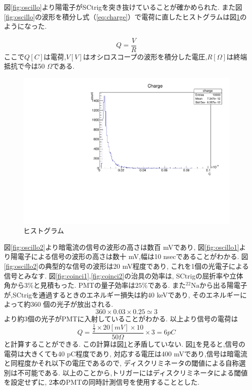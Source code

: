 図\ref{fig:oscillo}より陽電子がSCtrigを突き抜けていることが確かめられた.
また図\ref{fig:oscillo}の波形を積分し式（\ref{eq:charge}）で電荷に直したヒストグラムは図\ref{fig:charge}のようになった.

\begin{equation}
Q = \frac{V}{R}
\label{eq:charge}
\end{equation}
ここで$Q [C]$は電荷,$V [V]$はオシロスコープの波形を積分した電圧,$R [\Omega]$は終端抵抗で今は50 $\Omega$である.

\begin{figure}[H]
\centering
\includegraphics[keepaspectratio,angle=270,scale=0.7]{fig/ybm/charge.pdf}
\caption{ヒストグラム}
\label{fig:charge}
\end{figure}

図\ref{fig:oscillo2}より暗電流の信号の波形の高さは数百 mVであり,
図\ref{fig:oscillo1}より陽電子による信号の波形の高さは数十 mV,幅は10 nsecであることがわかる.
図\ref{fig:oscillo2}の典型的な信号の波形は20 mV程度であり,
これを1個の光電子による信号とみなす.
図\ref{fig:coinci1},\ref{fig:coinci2}の治具の効率は,
SCtrigの屈折率や立体角から$3 \%$と見積もった.
PMTの量子効率は$25 \%$である.
また$\mathrm{^{22}Na}$から出る陽電子が,SCtrigを通過するときのエネルギー損失は約40 keVであり,
そのエネルギーによって約360 個の光子が放出される.
\begin{equation}
360 \times 0.03 \times 0.25 \simeq 3
\label{eq:pe}
\end{equation}
より約3個の光子がPMTに入射していることがわかる.
以上より信号の電荷は
\begin{equation}
Q = \frac{\frac{1}{2} \times 20 [mV] \times 10}{50 \Omega} \times 3 = 6 \si{pC}
\label{eq:charge1}
\end{equation}
と計算することができる.
この計算は図\ref{fig:charge}と矛盾していない.
図\ref{fig:charge}を見ると,信号の電荷は大きくても40 pC程度であり,
対応する電圧は400 mVであり,信号は暗電流と同程度かそれ以下の電圧であるので,
ディスクリミネータの閾値による自称選別は不可能である.
以上のことから,トリガーにはディスクリミネータによる閾値を設定せずに,
2本のPMTの同時計測信号を使用することとした.


